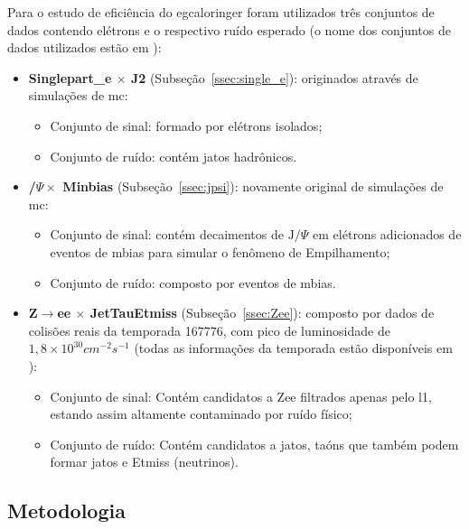Para o estudo de eficiência do \gls{egcaloringer} foram utilizados três
conjuntos de dados contendo elétrons e o respectivo ruído esperado
(o nome dos conjuntos de dados utilizados estão em \cite{portal_caloringer}):
\begin{itemize}
\item \textbf{Singlepart\_e $\times$ J2} (Subseção~\ref{ssec:single_e}): originados através de simulações de
\gls{mc}:
\begin{itemize}
\item Conjunto de sinal: formado por elétrons isolados;
\item Conjunto de ruído: contém jatos hadrônicos.
\end{itemize}
\item \textbf{/$\Psi \times$ Minbias} (Subseção~\ref{ssec:jpsi}): novamente original de simulações
de \gls{mc}:
\begin{itemize}
\item Conjunto de sinal: contém decaimentos de $\text{J}/\Psi$ em elétrons adicionados de eventos de
\gls{mbias} para simular o fenômeno de Empilhamento;
\item Conjunto de ruído: composto por eventos de \gls{mbias}.
\end{itemize}
\item \textbf{Z$\rightarrow$ee $\times$ JetTauEtmiss} (Subseção~\ref{ssec:Zee}): composto por dados de
colisões reais da temporada 167776, com pico de luminosidade de
$1,8\times10^{30}cm^{-2}s^{-1}$ (todas as informações da temporada estão
disponíveis em \cite{info_run}):
\begin{itemize}
\item Conjunto de sinal: Contém candidatos a Zee filtrados apenas pelo \gls{l1},
estando assim altamente contaminado por ruído físico;
\item Conjunto de ruído: Contém candidatos a jatos, taóns que também podem
formar jatos e \gls{Etmiss} (neutrinos).
\end{itemize}
\end{itemize}

\subsection{Metodologia} %
\label{ssec:metodologia}


